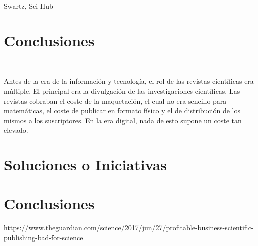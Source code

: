 Swartz, Sci-Hub

\section{Conclusiones}
=======

Antes de la era de la información y tecnología, el rol de las revistas científicas era múltiple. El principal era la divulgación de las investigaciones científicas. Las revistas cobraban el coste de la maquetación, el cual no era sencillo para matemáticas, el coste de publicar en formato físico y el de distribución de los mismos a los suscriptores. En la era digital, nada de esto supone un coste tan elevado.



\section{Soluciones o Iniciativas}
\section{Conclusiones}

https://www.theguardian.com/science/2017/jun/27/profitable-business-scientific-publishing-bad-for-science
